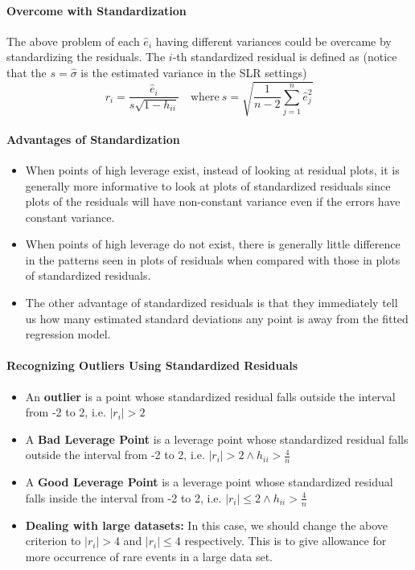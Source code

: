 \documentclass[11pt]{article}
\begin{document}
\paragraph{Overcome with Standardization} The above problem of each $\hat{e}_i$ having different variances could be overcame by standardizing the residuals. The $i$-th standardized residual is defined as (notice that the $s = \hat{\sigma}$ is the estimated variance in the SLR settings)
\begin{equation*}
    r_{i}=\frac{\hat{e}_{i}}{s \sqrt{1-h_{i i}}}\quad \text{where}~ s=\sqrt{\frac{1}{n-2} \sum_{j=1}^{n} \hat{e}_{j}^{2}}
\end{equation*}

\paragraph{Advantages of Standardization} 
\begin{itemize}
    \item When points of high leverage exist, instead of looking at residual plots, it is generally more informative to look at plots of standardized residuals since plots of the residuals will have non-constant variance even if the errors have constant variance.
    \item When points of high leverage do not exist, there is generally little difference in the patterns seen in plots of residuals when compared with those in plots of standardized residuals.
    \item The other advantage of standardized residuals is that they immediately tell us how many estimated standard deviations any point is away from the fitted regression model. 
\end{itemize}

\paragraph{Recognizing Outliers Using Standardized Residuals} 
\begin{itemize}
    \item An \textbf{outlier} is a point whose standardized residual falls outside the interval from -2 to 2, i.e. $|r_i| > 2$
    \item A \textbf{Bad Leverage Point} is a leverage point whose standardized residual falls outside the interval from -2 to 2, i.e. $|r_i| > 2 \wedge h_{ii} > \frac{4}{n}$
    \item A \textbf{Good Leverage Point} is a leverage point whose standardized residual falls inside the interval from -2 to 2, i.e. $|r_i| \leq 2 \wedge h_{ii} > \frac{4}{n}$
    \item \textbf{Dealing with large datasets:} In this case, we should change the above criterion to $|r_i| > 4$ and $|r_i| \leq 4$ respectively. This is to give allowance for more occurrence of rare events in a large data set.
\end{itemize}
\end{document}
